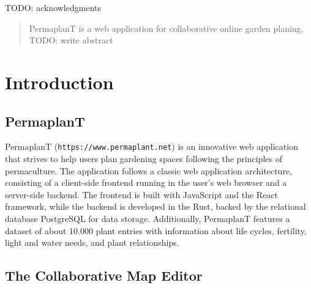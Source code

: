 \documentclass[final,draft]{vutinfth} %
\begin{document}
\frontmatter

\addstatementpage

\begin{acknowledgements*}

TODO: acknowledgments

\end{acknowledgements*}

\begin{abstract}
    PermaplanT is a web application for collaborative online garden planing. TODO: write abstract
\end{abstract}



\tableofcontents %

\mainmatter

\chapter{Introduction}

\section{PermaplanT}

PermaplanT (\texttt{https://www.permaplant.net}) is an innovative web application that strives to help users plan gardening spaces following the principles of permaculture.
The application follows a classic web application architecture, consisting of a client-side frontend running in the user's web browser and a server-side backend.
The frontend is built with JavaScript and the React framework, while the backend is developed in the Rust, backed by the relational database PostgreSQL for data storage.
Additionally, PermaplanT features a dataset of about 10.000 plant entries with information about life cycles, fertility, light and water needs, and plant relationships.

\section{The Collaborative Map Editor}
\end{document}

